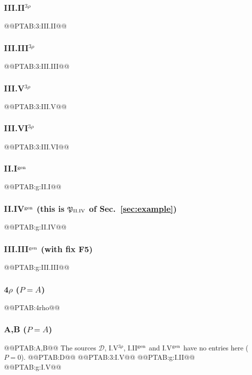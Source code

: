 \documentclass[10pt]{article}
\numberwithin{equation}{section}
\newcommand{\PP}{\mathfrak P}
\begin{document}
\subsubsection*{III.II$^{3\rho}$}
@@PTAB:3:III.II@@
\subsubsection*{III.III$^{3\rho}$}
@@PTAB:3:III.III@@
\subsubsection*{III.V$^{3\rho}$}
@@PTAB:3:III.V@@
\subsubsection*{III.VI$^{3\rho}$}
@@PTAB:3:III.VI@@
\subsubsection*{II.I$^{\rm gen}$}
@@PTAB:g:II.I@@
\subsubsection*{II.IV$^{\rm gen}$ (this is $\PP_{\rm II.IV}$ of Sec.~\ref{sec:example})}
@@PTAB:g:II.IV@@
\subsubsection*{III.III$^{\rm gen}$ (with fix F5)}
@@PTAB:g:III.III@@
\subsubsection*{4$\rho$ ($P=A$)}
@@PTAB:4rho@@
\subsubsection*{A,B ($P=A$)}
@@PTAB:A,B@@
The sources $\mathcal D$, I.V$^{3\rho}$, I.II$^{\rm gen}$ and I.V$^{\rm gen}$ have no entries here ($P=0$).
@@PTAB:D@@
@@PTAB:3:I.V@@
@@PTAB:g:I.II@@
@@PTAB:g:I.V@@
\end{document}
